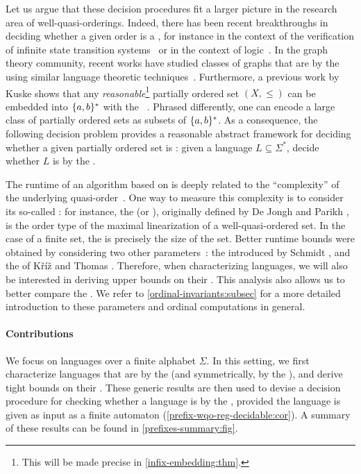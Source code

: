 \AP Let us argue that these decision procedures fit a larger picture in the
research area of well-quasi-orderings.
Indeed, there has been recent breakthroughs in deciding whether a given order
is a , for instance in the context of the verification of
infinite state transition systems~\cite{DBLP:conf/fsttcs/FinkelG19} or in the
context of logic~\cite{DBLP:journals/pacmpl/BergstrasserGLZ24}.
In the graph theory community, recent works have studied classes of graphs 
that are  by the 
using similar language theoretic techniques~\cite{DRT10,L24:arxiv:v2,ALM17}.
Furthermore, a previous work by Kuske shows that any
\emph{reasonable}\footnote{ This will be made precise in
\cref{infix-embedding:thm}. } partially ordered set $(X, \leq)$ can
be embedded into $\{ a,b \}^*$ with the ~\cite[Lemma
5.1]{DBLP:journals/ita/Kuske06}. Phrased differently, one can encode a large
class of partially ordered sets as subsets of $\{ a,b \}^*$. As a consequence,
the following decision problem provides a reasonable abstract framework for
deciding whether a given partially ordered set is :
given a language $L \subseteq \Sigma^*$, decide whether $L$ is
 by the .

\AP The runtime of an algorithm based on  is deeply
related to the ``complexity'' of the underlying quasi-order~\cite{SCHMITZ17}.
One way to measure this complexity is to consider its so-called : for instance, the  (or ),
originally defined by De Jongh and Parikh \cite{dejongh77}, is the order type
of the maximal linearization of a well-quasi-ordered set. In the case of a
finite set, the  is precisely the size of the set. Better runtime
bounds were obtained by considering two other parameters~\cite{SCHMITZ19}: the
 introduced by Schmidt \cite{schmidt81}, and the  of Kříž and Thomas \cite{kriz90b}. Therefore, when characterizing
 languages, we will also be interested in deriving upper
bounds on their . This analysis also allows us to better
compare the . We refer to
\cref{ordinal-invariants:subsec} for a more detailed introduction to these
parameters and ordinal computations in general.

\paragraph*{Contributions} We focus on languages over a finite alphabet
$\Sigma$. In this setting, we first characterize languages that are
 by the  (and symmetrically, by the
), and derive tight bounds on their . These generic results are then used to devise a decision procedure
for checking whether a language is  by the , provided the language is given as input as a finite automaton
(\cref{prefix-wqo-reg-decidable:cor}). A
summary of these results can be found in \cref{prefixes-summary:fig}.


